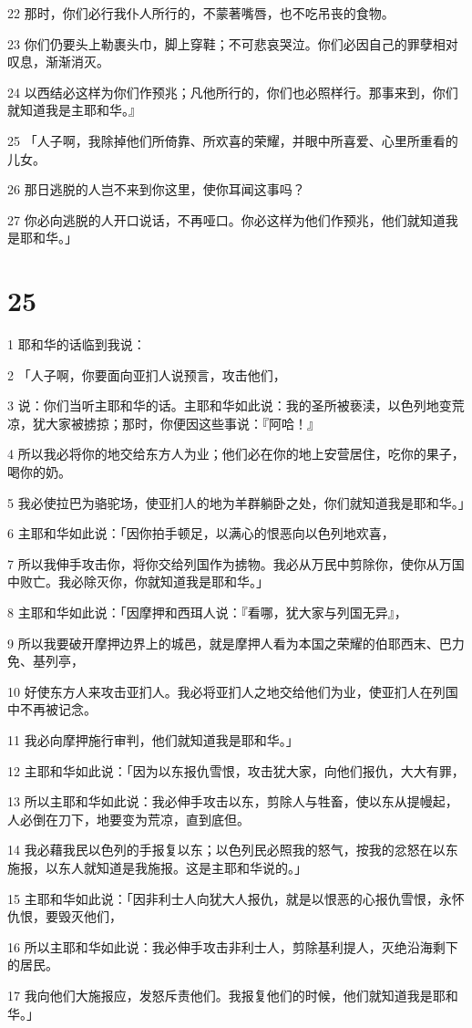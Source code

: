 \par 22 那时，你们必行我仆人所行的，不蒙著嘴唇，也不吃吊丧的食物。
\par 23 你们仍要头上勒裹头巾，脚上穿鞋；不可悲哀哭泣。你们必因自己的罪孽相对叹息，渐渐消灭。
\par 24 以西结必这样为你们作预兆；凡他所行的，你们也必照样行。那事来到，你们就知道我是主耶和华。』
\par 25 「人子啊，我除掉他们所倚靠、所欢喜的荣耀，并眼中所喜爱、心里所重看的儿女。
\par 26 那日逃脱的人岂不来到你这里，使你耳闻这事吗？
\par 27 你必向逃脱的人开口说话，不再哑口。你必这样为他们作预兆，他们就知道我是耶和华。」

\chapter{25}

\par 1 耶和华的话临到我说：
\par 2 「人子啊，你要面向亚扪人说预言，攻击他们，
\par 3 说：你们当听主耶和华的话。主耶和华如此说：我的圣所被亵渎，以色列地变荒凉，犹大家被掳掠；那时，你便因这些事说：『阿哈！』
\par 4 所以我必将你的地交给东方人为业；他们必在你的地上安营居住，吃你的果子，喝你的奶。
\par 5 我必使拉巴为骆驼场，使亚扪人的地为羊群躺卧之处，你们就知道我是耶和华。」
\par 6 主耶和华如此说：「因你拍手顿足，以满心的恨恶向以色列地欢喜，
\par 7 所以我伸手攻击你，将你交给列国作为掳物。我必从万民中剪除你，使你从万国中败亡。我必除灭你，你就知道我是耶和华。」
\par 8 主耶和华如此说：「因摩押和西珥人说：『看哪，犹大家与列国无异』，
\par 9 所以我要破开摩押边界上的城邑，就是摩押人看为本国之荣耀的伯耶西末、巴力免、基列亭，
\par 10 好使东方人来攻击亚扪人。我必将亚扪人之地交给他们为业，使亚扪人在列国中不再被记念。
\par 11 我必向摩押施行审判，他们就知道我是耶和华。」
\par 12 主耶和华如此说：「因为以东报仇雪恨，攻击犹大家，向他们报仇，大大有罪，
\par 13 所以主耶和华如此说：我必伸手攻击以东，剪除人与牲畜，使以东从提幔起，人必倒在刀下，地要变为荒凉，直到底但。
\par 14 我必藉我民以色列的手报复以东；以色列民必照我的怒气，按我的忿怒在以东施报，以东人就知道是我施报。这是主耶和华说的。」
\par 15 主耶和华如此说：「因非利士人向犹大人报仇，就是以恨恶的心报仇雪恨，永怀仇恨，要毁灭他们，
\par 16 所以主耶和华如此说：我必伸手攻击非利士人，剪除基利提人，灭绝沿海剩下的居民。
\par 17 我向他们大施报应，发怒斥责他们。我报复他们的时候，他们就知道我是耶和华。」

